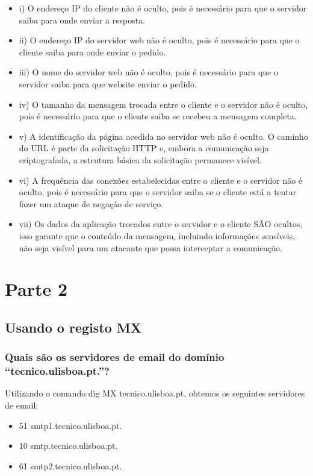 \documentclass{article}
\begin{document}
\begin{itemize}
    \item i) O endereço IP do cliente não é oculto, pois é necessário para que o servidor saiba para onde enviar a resposta.
    \item ii) O endereço IP do servidor web não é oculto, pois é necessário para que o cliente saiba para onde enviar o pedido.
    \item iii) O nome do servidor web não é oculto, pois é necessário para que o servidor saiba para que website enviar o pedido.
    \item iv) O tamanho da mensagem trocada entre o cliente e o servidor não é oculto, pois é necessário para que o cliente saiba se recebeu a mensagem completa.
    \item v) A identificação da página acedida no servidor web não é oculto. O caminho do URL é parte da solicitação HTTP e, embora a comunicação seja criptografada, a estrutura básica da solicitação permanece visível.
    \item vi) A frequência das conexões estabelecidas entre o cliente e o servidor não é oculto, pois é necessário para que o servidor saiba se o cliente está a tentar fazer um ataque de negação de serviço.
    \item vii) Os dados da aplicação trocados entre o servidor e o cliente SÃO ocultos, isso garante que o conteúdo da mensagem, incluindo informações sensíveis, não seja visível para um atacante que possa interceptar a comunicação. 
\end{itemize}

\section{Parte 2}
\subsection{Usando o registo MX}
\subsubsection{Quais são os servidores de email do domínio “tecnico.ulisboa.pt.”?}

Utilizando o comando dig MX tecnico.ulisboa.pt, obtemos os seguintes servidores de email:
\begin{itemize}
    \item 51 smtp1.tecnico.ulisboa.pt.
    \item 10 smtp.tecnico.ulisboa.pt.
    \item 61 smtp2.tecnico.ulisboa.pt.
\end{itemize}
\end{document}
